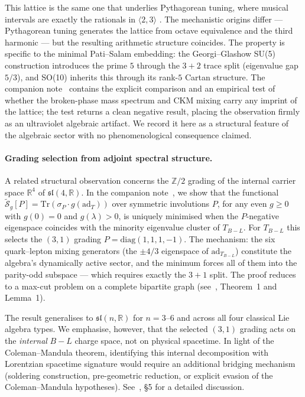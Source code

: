 \documentclass[11pt,a4paper]{article}
\newcommand{\sln}[1]{\mathfrak{sl}(#1,\mathbb{R})}
\theoremstyle{plain}
\theoremstyle{definition}
\theoremstyle{remark}
\begin{document}
This lattice is the same one that underlies Pythagorean tuning, where
musical intervals are exactly the rationals in $\langle 2, 3 \rangle$
\cite{Barker1989}.  The mechanistic origins differ --- Pythagorean
tuning generates the lattice from octave equivalence and the third
harmonic --- but the resulting arithmetic structure coincides.  The
property is specific to the minimal Pati--Salam embedding: the
Georgi--Glashow SU(5) construction introduces the prime $5$ through
the $3+2$ trace split (eigenvalue gap $5/3$), and SO(10) inherits
this through its rank-$5$ Cartan structure.  The companion
note~\cite{WallaceN1} contains the explicit comparison and an
empirical test of whether the broken-phase mass spectrum and CKM
mixing carry any imprint of the lattice; the test returns a clean
negative result, placing the observation firmly as an ultraviolet
algebraic artifact.  We record it here as a structural feature of
the algebraic sector with no phenomenological consequence claimed.

\paragraph{Grading selection from adjoint spectral structure.}
A related structural observation concerns the $\mathbb{Z}/2$
grading of the internal carrier space $\mathbb{R}^4$ of $\sln{4}$.
In the companion note~\cite{WallaceN2}, we show that the functional
$\widetilde{\mathcal{S}}_g[P] = \mathrm{Tr}(\sigma_P \cdot g(\mathrm{ad}_T))$
over symmetric involutions $P$, for any even $g \ge 0$ with
$g(0) = 0$ and $g(\lambda) > 0$, is uniquely minimised when the
$P$-negative eigenspace coincides with the minority eigenvalue
cluster of $T_{B{-}L}$.  For $T_{B{-}L}$ this selects the
$(3,1)$ grading $P = \mathrm{diag}(1,1,1,-1)$.  The mechanism:
the six quark--lepton mixing generators (the $\pm 4/3$ eigenspace
of $\mathrm{ad}_{T_{B{-}L}}$) constitute the algebra's dynamically
active sector, and the minimum forces all of them into the
parity-odd subspace --- which requires exactly the $3{+}1$ split.
The proof reduces to a max-cut problem on a complete bipartite
graph (see~\cite{WallaceN2}, Theorem~1 and Lemma~1).

The result generalises to $\mathfrak{sl}(n,\mathbb{R})$ for
$n = 3$--$6$ and across all four classical Lie algebra types.  We
emphasise, however, that the selected $(3,1)$ grading acts on the
\emph{internal} $B{-}L$ charge space, not on physical spacetime.
In light of the Coleman--Mandula theorem, identifying this internal
decomposition with Lorentzian spacetime signature would require an
additional bridging mechanism (soldering construction, pre-geometric
reduction, or explicit evasion of the Coleman--Mandula hypotheses).
See~\cite{WallaceN2}, \S5 for a detailed discussion.
\end{document}
